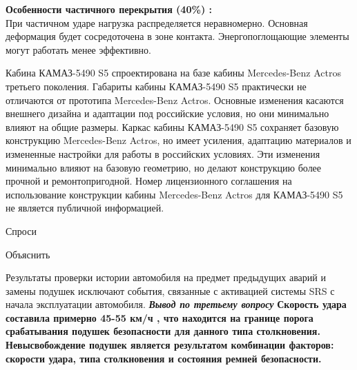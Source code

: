 	


%	







\textbf{Особенности частичного перекрытия (40\%) :}\\
При частичном ударе нагрузка распределяется неравномерно.
Основная деформация будет сосредоточена в зоне контакта.
Энергопоглощающие элементы могут работать менее эффективно.	


Кабина КАМАЗ-5490 S5 спроектирована на базе кабины Mercedes-Benz Actros третьего поколения. Габариты кабины КАМАЗ-5490 S5 практически не отличаются от прототипа Mercedes-Benz Actros. Основные изменения касаются внешнего дизайна и адаптации под российские условия, но они минимально влияют на общие размеры. Каркас кабины КАМАЗ-5490 S5 сохраняет базовую конструкцию Mercedes-Benz Actros, но имеет усиления, адаптацию материалов и измененные настройки для работы в российских условиях. Эти изменения минимально влияют на базовую геометрию, но делают конструкцию более прочной и ремонтопригодной. Номер лицензионного соглашения на использование конструкции кабины Mercedes-Benz Actros для КАМАЗ-5490 S5 не является публичной информацией.


Спроси

Объяснить








Результаты проверки истории автомобиля на предмет предыдущих аварий и замены подушек исключают события, связанные с активацией системы SRS с начала эксплуатации автомобиля.	
\textbf{\textsl{	Вывод по третьему вопросу}}
\textbf{Скорость удара составила примерно 45-55 км/ч , что находится на границе порога срабатывания подушек безопасности для данного типа столкновения. Невысвобождение подушек является результатом комбинации факторов: скорости удара, типа столкновения и состояния ремней безопасности.}
	